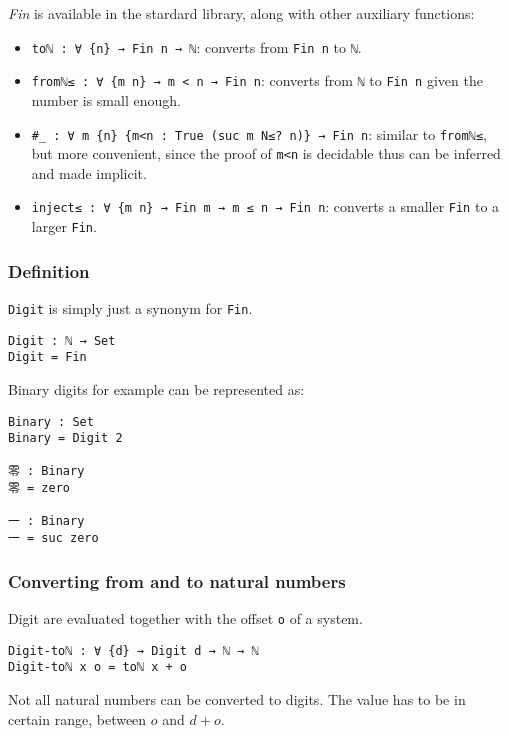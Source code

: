 \documentclass[12pt, a4paper]{article}
\begin{document}
\textit{Fin} is available in the stardard library, along with other auxiliary
functions:

\begin{itemize}
    \item {\lstinline|toℕ : ∀ {n} → Fin n → ℕ|}: converts from {\lstinline|Fin n|} to {\lstinline|ℕ|}.
    \item {\lstinline|fromℕ≤ : ∀ {m n} → m < n → Fin n|}: converts from {\lstinline|ℕ|} to {\lstinline|Fin n|} given the number is small enough.
    \item {\lstinline|#_ : ∀ m {n} {m<n : True (suc m N≤? n)} → Fin n|}:
        similar to {\lstinline|fromℕ≤|}, but more convenient, since the proof of {\lstinline|m<n|} is decidable thus can be inferred and made implicit.
    \item {\lstinline|inject≤ : ∀ {m n} → Fin m → m ≤ n → Fin n|}: converts a smaller {\lstinline|Fin|} to a larger {\lstinline|Fin|}.
\end{itemize}

\subsubsection{Definition}

{\lstinline|Digit|} is simply just a synonym for {\lstinline|Fin|}.

\begin{lstlisting}
Digit : ℕ → Set
Digit = Fin
\end{lstlisting}

Binary digits for example can be represented as:

\begin{lstlisting}
Binary : Set
Binary = Digit 2

零 : Binary
零 = zero

一 : Binary
一 = suc zero
\end{lstlisting}

\subsubsection{Converting from and to natural numbers}

Digit are evaluated together with the offset {\lstinline|o|} of a system.

\begin{lstlisting}
Digit-toℕ : ∀ {d} → Digit d → ℕ → ℕ
Digit-toℕ x o = toℕ x + o
\end{lstlisting}

Not all natural numbers can be converted to digits. The value has to be in certain
range, between $ o $ and $ d + o $.
\end{document}
